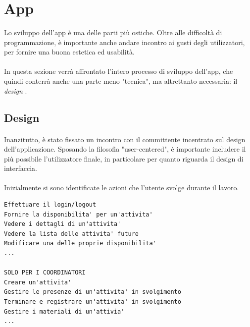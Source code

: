 \documentclass[11pt,a4paper,english]{article}
\begin{document}
\section{App}

\paragraph{} Lo sviluppo dell'app è una delle parti più ostiche. Oltre alle difficoltà di programmazione, è importante anche andare incontro ai gusti degli utilizzatori, per fornire una buona estetica ed usabilità. 

\paragraph{} In questa sezione verrà affrontato l'intero processo di sviluppo dell'app, che quindi conterrà anche una parte meno "tecnica", ma altrettanto necessaria: il \emph{design} \cite{design}.

\subsection{Design} 

\paragraph{} Inanzitutto, è stato fissato un incontro con il committente incentrato sul design dell'applicazione. Sposando la filosofia "user-centered", è importante includere il più possibile l'utilizzatore finale, in particolare per quanto riguarda il design di interfaccia. 


\paragraph{} Inizialmente si sono identificate le azioni che l'utente svolge durante il lavoro. 

\begin{lstlisting}[title=Lista dei task]
Effettuare il login/logout
Fornire la disponibilita' per un'attivita'
Vedere i dettagli di un'attivita'
Vedere la lista delle attivita' future
Modificare una delle proprie disponibilita'
...

SOLO PER I COORDINATORI
Creare un'attivita'
Gestire le presenze di un'attivita' in svolgimento
Terminare e registrare un'attivita' in svolgimento
Gestire i materiali di un'attivia'
...
\end{lstlisting}
\end{document}
